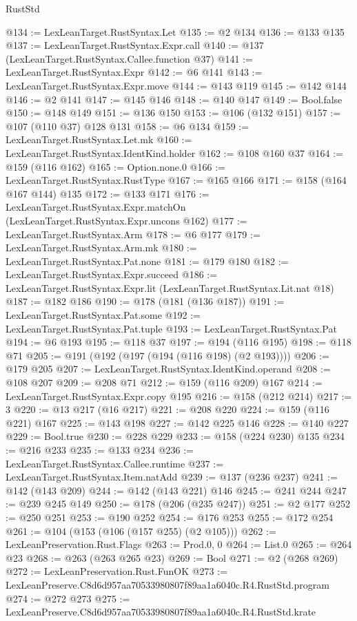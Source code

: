 \begin{lexlean}{RustStd}
\begin{coremodule}
@134 := LexLeanTarget.RustSyntax.Let
@135 := @2 @134
@136 := @133 @135
@137 := LexLeanTarget.RustSyntax.Expr.call
@140 := @137 (LexLeanTarget.RustSyntax.Callee.function @37)
@141 := LexLeanTarget.RustSyntax.Expr
@142 := @6 @141
@143 := LexLeanTarget.RustSyntax.Expr.move
@144 := @143 @119
@145 := @142 @144
@146 := @2 @141
@147 := @145 @146
@148 := @140 @147
@149 := Bool.false
@150 := @148 @149
@151 := @136 @150
@153 := @106 (@132 @151)
@157 := @107 (@110 @37) @128 @131
@158 := @6 @134
@159 := LexLeanTarget.RustSyntax.Let.mk
@160 := LexLeanTarget.RustSyntax.IdentKind.holder
@162 := @108 @160 @37
@164 := @159 (@116 @162)
@165 := Option.none.{0}
@166 := LexLeanTarget.RustSyntax.RustType
@167 := @165 @166
@171 := @158 (@164 @167 @144) @135
@172 := @133 @171
@176 := LexLeanTarget.RustSyntax.Expr.matchOn (LexLeanTarget.RustSyntax.Expr.uncons @162)
@177 := LexLeanTarget.RustSyntax.Arm
@178 := @6 @177
@179 := LexLeanTarget.RustSyntax.Arm.mk
@180 := LexLeanTarget.RustSyntax.Pat.none
@181 := @179 @180
@182 := LexLeanTarget.RustSyntax.Expr.succeed
@186 := LexLeanTarget.RustSyntax.Expr.lit (LexLeanTarget.RustSyntax.Lit.nat @18)
@187 := @182 @186
@190 := @178 (@181 (@136 @187))
@191 := LexLeanTarget.RustSyntax.Pat.some
@192 := LexLeanTarget.RustSyntax.Pat.tuple
@193 := LexLeanTarget.RustSyntax.Pat
@194 := @6 @193
@195 := @118 @37
@197 := @194 (@116 @195)
@198 := @118 @71
@205 := @191 (@192 (@197 (@194 (@116 @198) (@2 @193))))
@206 := @179 @205
@207 := LexLeanTarget.RustSyntax.IdentKind.operand
@208 := @108 @207
@209 := @208 @71
@212 := @159 (@116 @209) @167
@214 := LexLeanTarget.RustSyntax.Expr.copy @195
@216 := @158 (@212 @214)
@217 := 3
@220 := @13 @217 (@16 @217)
@221 := @208 @220
@224 := @159 (@116 @221) @167
@225 := @143 @198
@227 := @142 @225 @146
@228 := @140 @227
@229 := Bool.true
@230 := @228 @229
@233 := @158 (@224 @230) @135
@234 := @216 @233
@235 := @133 @234
@236 := LexLeanTarget.RustSyntax.Callee.runtime
@237 := LexLeanTarget.RustSyntax.Item.natAdd
@239 := @137 (@236 @237)
@241 := @142 (@143 @209)
@244 := @142 (@143 @221) @146
@245 := @241 @244
@247 := @239 @245 @149
@250 := @178 (@206 (@235 @247))
@251 := @2 @177
@252 := @250 @251
@253 := @190 @252
@254 := @176 @253
@255 := @172 @254
@261 := @104 (@153 (@106 (@157 @255) (@2 @105)))
@262 := LexLeanPreservation.Rust.Flags
@263 := Prod.{0, 0}
@264 := List.{0}
@265 := @264 @23
@268 := @263 (@263 @265 @23)
@269 := Bool
@271 := @2 (@268 @269)
@272 := LexLeanPreservation.Rust.FunOK
@273 := LexLeanPreserve.C8d6d957aa70533980807f89aa1a6040c.R4.RustStd.program
@274 := @272 @273
@275 := LexLeanPreserve.C8d6d957aa70533980807f89aa1a6040c.R4.RustStd.krate

\end{coremodule}
\end{lexlean}
